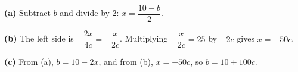 \textbf{(a)} Subtract $b$ and divide by $2$: $x=\boxed{\dfrac{10-b}{2}}$.

\textbf{(b)} The left side is $-\dfrac{2x}{4c}=-\dfrac{x}{2c}$. Multiplying $-\dfrac{x}{2c}=25$ by $-2c$ gives $x=\boxed{-50c}$.

\textbf{(c)} From (a), $b=10-2x$, and from (b), $x=-50c$, so $b=\boxed{10+100c}$.
